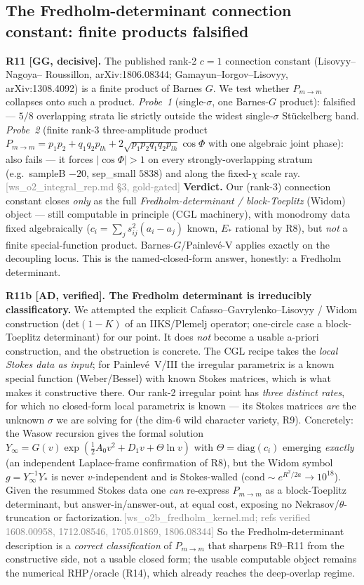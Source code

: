 \documentclass[aps,prd,reprint,nofootinbib]{revtex4-2}
\newcommand{\pnote}[1]{\textcolor{gray}{\footnotesize\,[#1]}}
\newcommand{\Pmid}{P_{m\to m}}   %
\newcommand{\half}{\tfrac12}
\begin{document}
\subsection{The Fredholm-determinant connection constant: finite products falsified}\label{sec:fredholm}
\textbf{R11 [GG, decisive].} The published rank-2 $c{=}1$ connection constant (Lisovyy--Nagoya--
Roussillon, arXiv:1806.08344; Gamayun--Iorgov--Lisovyy, arXiv:1308.4092) is a finite product of
Barnes $G$. We test whether $\Pmid$ collapses onto such a product. \emph{Probe~1} (single-$\sigma$,
one Barnes-$G$ product): falsified --- $5/8$ overlapping strata lie strictly outside the widest
single-$\sigma$ Stückelberg band. \emph{Probe~2} (finite rank-3 three-amplitude product
$\Pmid=p_1p_2+q_1q_2p_{lh}+2\sqrt{p_1p_2q_1q_2p_{lh}}\cos\Phi$ with one algebraic joint phase): also
fails --- it forces $|\cos\Phi|>1$ on every strongly-overlapping stratum (e.g.\ sampleB $-20$,
sep\_small $5838$) and along the fixed-$\chi$ scale ray.\pnote{ws\_o2\_integral\_rep.md \S3, gold-gated}
\textbf{Verdict.} Our (rank-3) connection constant closes \emph{only} as the full
\emph{Fredholm-determinant / block-Toeplitz} (Widom) object --- still computable in principle (CGL
machinery), with monodromy
data fixed algebraically ($c_i=\sum_j s_{ij}^2(a_i-a_j)$ known, $E_*$ rational by R8), but \emph{not}
a finite special-function product. Barnes-$G$/Painlev\'e-V applies exactly on the decoupling locus.
This is the named-closed-form answer, honestly: a Fredholm determinant.

\textbf{R11b [AD, verified]. The Fredholm determinant is irreducibly classificatory.} We attempted
the explicit Cafasso--Gavrylenko--Lisovyy / Widom construction (det$(1-K)$ of an IIKS/Plemelj
operator; one-circle case a block-Toeplitz determinant) for our point. It does \emph{not} become a
usable a-priori construction, and the obstruction is concrete. The CGL recipe takes the
\emph{local Stokes data as input}; for Painlev\'e~V/III the irregular parametrix is a known
special function (Weber/Bessel) with known Stokes matrices, which is what makes it constructive
there. Our rank-2 irregular point has \emph{three distinct rates}, for which no closed-form local
parametrix is known --- its Stokes matrices \emph{are} the unknown $\sigma$ we are solving for
(the dim-$6$ wild character variety, R9). Concretely: the Wasow recursion gives the formal solution
$Y_\infty=G(v)\exp(\half A_0 v^2+D_1 v+\Theta\ln v)$ with $\Theta=\mathrm{diag}(c_i)$ emerging
\emph{exactly} (an independent Laplace-frame confirmation of R8), but the Widom symbol
$g=Y_\infty^{-1}Y_*$ is never $v$-independent and is Stokes-walled
($\mathrm{cond}\sim e^{R^2/2a}\to10^{18}$). Given the resummed Stokes data one \emph{can} re-express
$\Pmid$ as a block-Toeplitz determinant, but answer-in/answer-out, at equal cost, exposing no
Nekrasov/$\theta$-truncation or factorization.\pnote{ws\_o2b\_fredholm\_kernel.md; refs verified
1608.00958, 1712.08546, 1705.01869, 1806.08344} So the Fredholm-determinant description is a
\emph{correct classification} of $\Pmid$ that sharpens R9--R11 from the constructive side, not a
usable closed form; the usable computable object remains the numerical RHP/oracle (R14), which
already reaches the deep-overlap regime.
\end{document}
